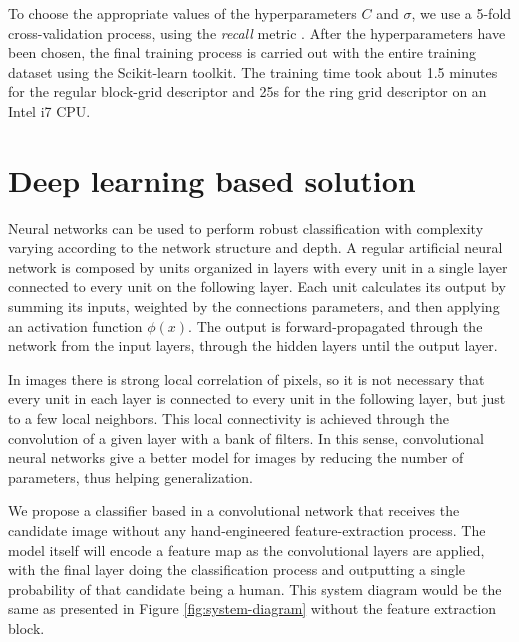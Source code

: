       To choose the appropriate values of the hyperparameters $C$ and $\sigma$, we use a 5-fold cross-validation process, using the \textit{recall} metric \cite{evaluationMetrics}. After the hyperparameters have been chosen, the final training process is carried out with the entire training dataset using the Scikit-learn \cite{scikit-learn} toolkit. The training time took about 1.5 minutes for the regular block-grid descriptor and 25s for the ring grid descriptor on an Intel i7 CPU.


\section{Deep learning based solution}
\label{sec:deep}

    Neural networks can be used to perform robust classification with complexity varying according to the network structure and depth. A regular artificial neural network is composed by units organized in layers with every unit in a single layer connected to every unit on the following layer. Each unit calculates its output by summing its inputs, weighted by the connections parameters, and then applying an activation function $\phi(x)$. The output is forward-propagated through the network from the input layers, through the hidden layers until the output layer.

    In images there is strong local correlation of pixels, so it is not necessary that every unit in each layer is connected to every unit in the following layer, but just to a few local neighbors. This local connectivity is achieved through the convolution of a given layer with a bank of filters. In this sense, convolutional neural networks give a better model for images by reducing the number of parameters, thus helping generalization.

    We propose a classifier based in a convolutional network that receives the candidate image without any hand-engineered feature-extraction process. The model itself will encode a feature map as the convolutional layers are applied, with the final layer doing the classification process and outputting a single probability of that candidate being a human. This system diagram would be the same as presented in Figure \ref{fig:system-diagram} without the feature extraction block.

